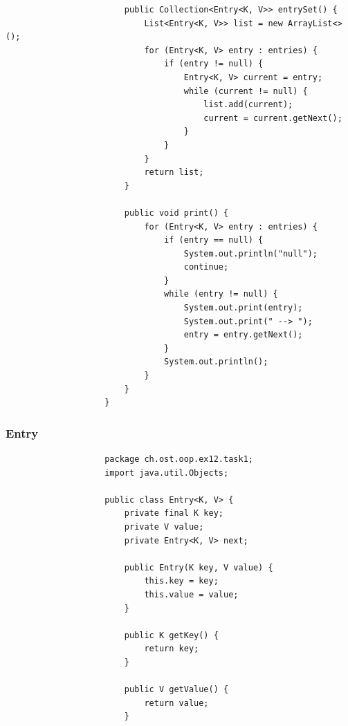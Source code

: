 \documentclass[a4paper, landscape, 8pt]{scrartcl}
\begin{document}
\begin{multicols*}{4}
\begin{lstlisting}
                        public Collection<Entry<K, V>> entrySet() {
                            List<Entry<K, V>> list = new ArrayList<>();
                            for (Entry<K, V> entry : entries) {
                                if (entry != null) {
                                    Entry<K, V> current = entry;
                                    while (current != null) {
                                        list.add(current);
                                        current = current.getNext();
                                    }
                                }
                            }
                            return list;
                        }

                        public void print() {
                            for (Entry<K, V> entry : entries) {
                                if (entry == null) {
                                    System.out.println("null");
                                    continue;
                                }
                                while (entry != null) {
                                    System.out.print(entry);
                                    System.out.print(" --> ");
                                    entry = entry.getNext();
                                }
                                System.out.println();
                            }
                        }
                    }
                \end{lstlisting}
                \subsubsection{Entry}
                    \begin{lstlisting}
                    package ch.ost.oop.ex12.task1;
                    import java.util.Objects;

                    public class Entry<K, V> {
                        private final K key;
                        private V value;
                        private Entry<K, V> next;

                        public Entry(K key, V value) {
                            this.key = key;
                            this.value = value;
                        }

                        public K getKey() {
                            return key;
                        }

                        public V getValue() {
                            return value;
                        }


\end{lstlisting}
\end{multicols*}
\end{document}
